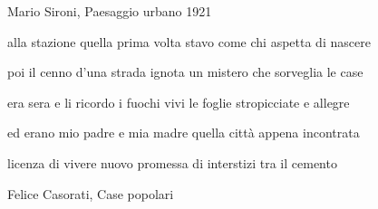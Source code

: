 \clearpage


\begin{artItem}
	Mario Sironi, Paesaggio urbano 1921
\end{artItem}

\begin{poem}
	\begin{stanza}
		alla stazione quella prima volta\verseline
		stavo come chi aspetta di nascere
	\end{stanza}

	\begin{stanza}
		poi il cenno d’una strada ignota\verseline
		un mistero che sorveglia le case
	\end{stanza}

	\begin{stanza}
		era sera e li ricordo i fuochi vivi\verseline
		le foglie stropicciate e allegre
	\end{stanza}

	\begin{stanza}
		ed erano mio padre e mia madre\verseline
		quella città appena incontrata
	\end{stanza}

	\begin{stanza}
		licenza di vivere nuovo\verseline
		promessa di interstizi tra il cemento
	\end{stanza}
\end{poem}

\clearpage


\begin{artItem}
	Felice Casorati, Case popolari
\end{artItem}

